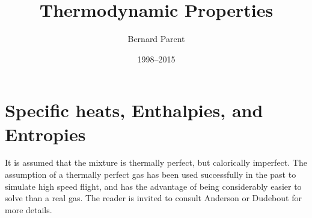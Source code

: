 \documentclass{warpdoc}
\author{
  Bernard Parent
}
\title{
  Thermodynamic Properties
}
\date{
  1998--2015
}
\begin{document}
  \pagestyle{headings}
  \setcounter{page}{1}
  \makewarpdoctitle
  \tableofcontents





\section{Specific heats, Enthalpies, and Entropies}

It is assumed that the mixture
is thermally perfect, but calorically imperfect. The assumption
of a thermally perfect gas has been used successfully in the
past to simulate high speed flight, and has the advantage of being
considerably easier to solve than a real gas. The reader is invited
to consult Anderson\cite{gen:anderson2} or Dudebout \cite{cfd:dudebout}
for more details.
%
\end{document}
